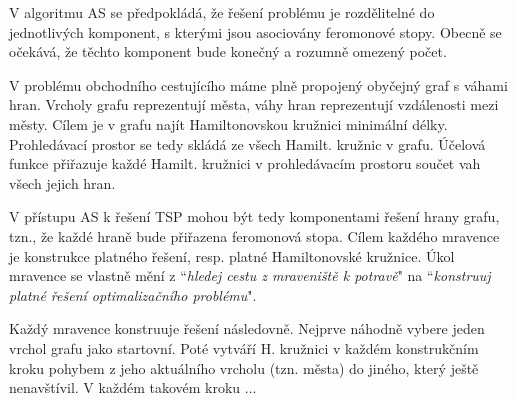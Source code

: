 \documentclass[a4paper,12pt]{article}
\begin{document}
V algoritmu AS se předpokládá, že řešení problému je rozdělitelné do jednotlivých komponent, s kterými jsou
asociovány feromonové stopy. Obecně se očekává, že těchto komponent bude konečný a rozumně omezený počet.

V problému obchodního cestujícího máme plně propojený obyčejný graf s váhami hran. Vrcholy grafu reprezentují
města, váhy hran reprezentují vzdálenosti mezi městy. Cílem je v grafu najít Hamiltonovskou kružnici
minimální délky. Prohledávací prostor se tedy skládá ze všech Hamilt. kružnic v grafu.
Účelová funkce přiřazuje každé Hamilt. kružnici v prohledávacím prostoru součet vah všech jejich hran.

\medskip

V přístupu AS k řešení TSP mohou být tedy komponentami řešení hrany grafu, tzn., že každé hraně bude přiřazena
feromonová stopa. Cílem každého mravence je konstrukce platného řešení, resp. platné Hamiltonovské kružnice.
Úkol mravence se vlastně mění z \textquotedblleft{\it hledej cestu z mraveniště k potravě}" na
 \textquotedblleft{\it konstruuj platné řešení optimalizačního problému}".

Každý mravence konstruuje řešení následovně. Nejprve náhodně vybere jeden vrchol grafu jako startovní.
Poté vytváří H. kružnici v každém konstrukčním kroku pohybem z jeho aktuálního vrcholu (tzn. města)
do jiného, který ještě nenavštívil. V každém takovém kroku ...




\end{document}
